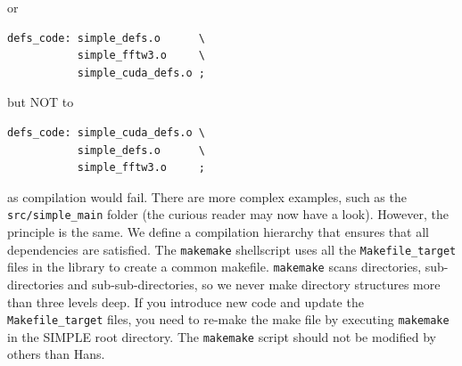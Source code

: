 \documentclass[a4paper,11pt]{article}
\begin{document}
or
\begin{verbatim}
defs_code: simple_defs.o      \
           simple_fftw3.o     \
           simple_cuda_defs.o ;
\end{verbatim}
but NOT to
\begin{verbatim}
defs_code: simple_cuda_defs.o \
           simple_defs.o      \
           simple_fftw3.o     ;
\end{verbatim}
as compilation would fail. There are more complex examples, such as the \texttt{src/simple\_main} folder (the curious reader may now have a look). However, the principle is the same. We define a compilation hierarchy that ensures that all dependencies are satisfied. The \texttt{makemake} shellscript uses all the \texttt{Makefile\_target} files in the library to create a common makefile. \texttt{makemake} scans directories, sub-directories and sub-sub-directories, so we never make directory structures more than three levels deep. If you introduce new code and update the \texttt{Makefile\_target} files, you need to re-make the make file by executing \texttt{makemake} in the SIMPLE root directory. The \texttt{makemake} script should not be modified by others than Hans.
\end{document}

